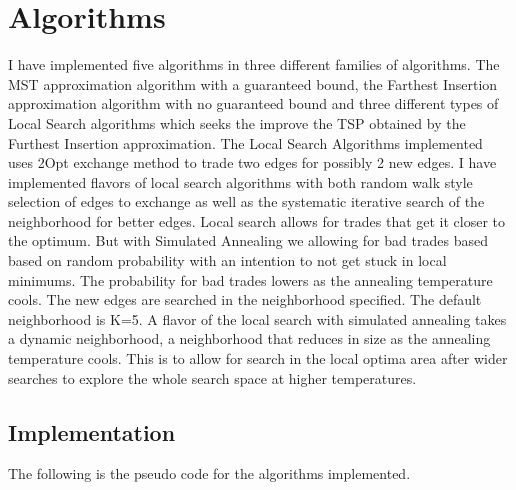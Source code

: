 \documentclass[twoside,11pt]{article}
\begin{document}
\section{Algorithms}
I have implemented five algorithms in three different families of algorithms. The MST approximation algorithm with a guaranteed bound, the Farthest Insertion approximation algorithm with no guaranteed bound and three different types of Local Search algorithms which seeks the improve the TSP obtained by the Furthest Insertion approximation. The Local Search Algorithms implemented uses 2Opt exchange method to trade two edges for possibly 2 new edges. I have implemented flavors of local search algorithms with both random walk style selection of edges to exchange as well as the systematic iterative search of the neighborhood for better edges. Local search allows for trades that get it closer to the optimum. But with Simulated Annealing we allowing for bad trades based based on random probability with an intention to not get stuck in local minimums. The probability for bad trades lowers as the annealing temperature cools. The new edges are searched in the neighborhood specified. The default neighborhood is K=5. A flavor of the local search with simulated annealing takes a dynamic neighborhood, a neighborhood that reduces in size as the annealing temperature cools. This is to allow for search in the local optima area after wider searches to explore the whole search space at higher temperatures.

\subsection{Implementation}
The following is the pseudo code for the algorithms implemented. 
\end{document}
